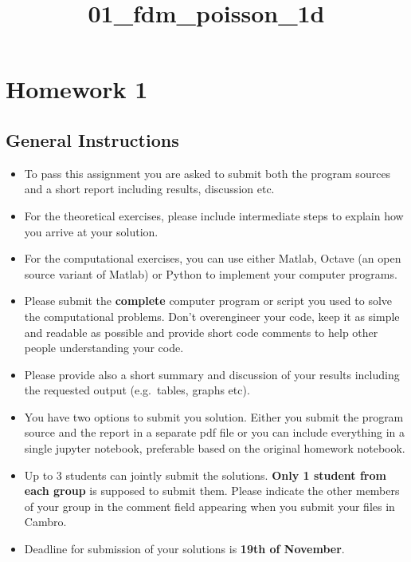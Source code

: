 \documentclass[11pt]{article}
\title{01\_fdm\_poisson\_1d}
\begin{document}
    
    
    \maketitle
    
    

    
    \section{Homework 1}\label{homework-1}

    \subsection{General Instructions}\label{general-instructions}

\begin{itemize}
\item
  To pass this assignment you are asked to submit both the program
  sources and a short report including results, discussion etc.
\item
  For the theoretical exercises, please include intermediate steps to
  explain how you arrive at your solution.
\item
  For the computational exercises, you can use either Matlab, Octave (an
  open source variant of Matlab) or Python to implement your computer
  programs.
\item
  Please submit the \textbf{complete} computer program or script you
  used to solve the computational problems. Don't overengineer your
  code, keep it as simple and readable as possible and provide short
  code comments to help other people understanding your code.
\item
  Please provide also a short summary and discussion of your results
  including the requested output (e.g.~tables, graphs etc).
\item
  You have two options to submit you solution. Either you submit the
  program source and the report in a separate pdf file or you can
  include everything in a single jupyter notebook, preferable based on
  the original homework notebook.
\item
  Up to 3 students can jointly submit the solutions. \textbf{Only 1
  student from each group} is supposed to submit them. Please indicate
  the other members of your group in the comment field appearing when
  you submit your files in Cambro.
\item
  Deadline for submission of your solutions is \textbf{19th of
  November}.
\end{itemize}
\end{document}
